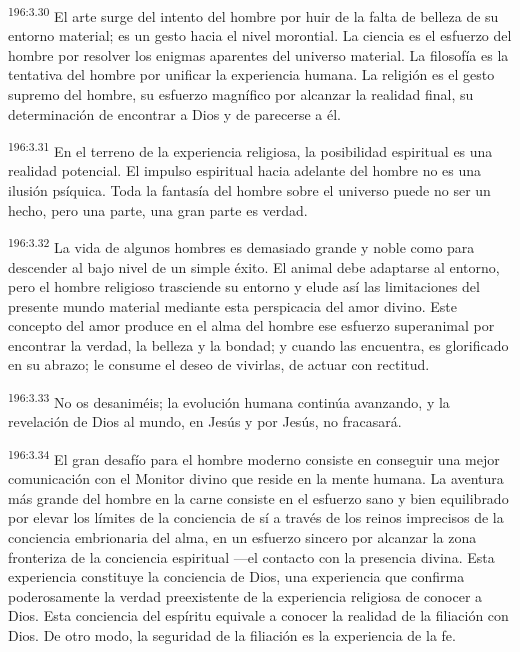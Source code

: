 \par
\textsuperscript{196:3.30} El arte surge del intento del hombre por huir de la falta de belleza de su entorno material; es un gesto hacia el nivel morontial. La ciencia es el esfuerzo del hombre por resolver los enigmas aparentes del universo material. La filosofía es la tentativa del hombre por unificar la experiencia humana. La religión es el gesto supremo del hombre, su esfuerzo magnífico por alcanzar la realidad final, su determinación de encontrar a Dios y de parecerse a él.

\par
\textsuperscript{196:3.31} En el terreno de la experiencia religiosa, la posibilidad espiritual es una realidad potencial. El impulso espiritual hacia adelante del hombre no es una ilusión psíquica. Toda la fantasía del hombre sobre el universo puede no ser un hecho, pero una parte, una gran parte es verdad.

\par
\textsuperscript{196:3.32} La vida de algunos hombres es demasiado grande y noble como para descender al bajo nivel de un simple éxito. El animal debe adaptarse al entorno, pero el hombre religioso trasciende su entorno y elude así las limitaciones del presente mundo material mediante esta perspicacia del amor divino. Este concepto del amor produce en el alma del hombre ese esfuerzo superanimal por encontrar la verdad, la belleza y la bondad; y cuando las encuentra, es glorificado en su abrazo; le consume el deseo de vivirlas, de actuar con rectitud.

\par
\textsuperscript{196:3.33} No os desaniméis; la evolución humana continúa avanzando, y la revelación de Dios al mundo, en Jesús y por Jesús, no fracasará.

\par
\textsuperscript{196:3.34} El gran desafío para el hombre moderno consiste en conseguir una mejor comunicación con el Monitor divino que reside en la mente humana. La aventura más grande del hombre en la carne consiste en el esfuerzo sano y bien equilibrado por elevar los límites de la conciencia de sí a través de los reinos imprecisos de la conciencia embrionaria del alma, en un esfuerzo sincero por alcanzar la zona fronteriza de la conciencia espiritual ---el contacto con la presencia divina. Esta experiencia constituye la conciencia de Dios, una experiencia que confirma poderosamente la verdad preexistente de la experiencia religiosa de conocer a Dios. Esta conciencia del espíritu equivale a conocer la realidad de la filiación con Dios. De otro modo, la seguridad de la filiación es la experiencia de la fe.

